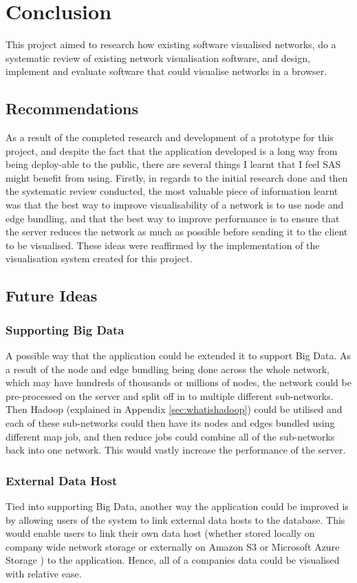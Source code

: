 \documentclass[../dissertation.tex]{subfiles}
\begin{document}
\chapter{Conclusion}

This project aimed to research how existing software visualised networks, do a systematic review of existing network visualisation software, and design, implement and evaluate software that could visualise networks in a browser. 

\section{Recommendations}

As a result of the completed research and development of a prototype for this project, and despite the fact that the application developed is a long way from being deploy-able to the public, there are several things I learnt that I feel SAS might benefit from using. Firstly, in regards to the initial research done and then the systematic review conducted, the most valuable piece of information learnt was that the best way to improve visualisability of a network is to use node and edge bundling, and that the best way to improve performance is to ensure that the server reduces the network as much as possible before sending it to the client to be visualised. These ideas were reaffirmed by the implementation of the visualisation system created for this project.

\section{Future Ideas}
\label{sec:further_ideas}

\subsection{Supporting Big Data}

A possible way that the application could be extended it to support Big Data. As a result of the node and edge bundling being done across the whole network, which may have hundreds of thousands or millions of nodes, the network could be pre-processed on the server and split off in to multiple different sub-networks. Then Hadoop \cite{hadoop} (explained in Appendix \ref{sec:whatishadoop}) could be utilised and each of these sub-networks could then have its nodes and edges bundled using different map job, and then reduce jobs could combine all of the sub-networks back into one network. This would vastly increase the performance of the server.

\subsection{External Data Host}

Tied into supporting Big Data, another way the application could be improved is by allowing users of the system to link external data hosts to the database. This would enable users to link their own data host (whether stored locally on company wide network storage or externally on Amazon S3 \cite{amazons3} or Microsoft Azure Storage \cite{msftazure}) to the application. Hence, all of a companies data could be visualised with relative ease.
\end{document}

